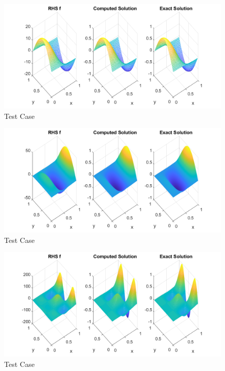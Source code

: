 \begin{enumerate}
\begin{figure}
\centering        
\includegraphics[width=1.0\textwidth]{../code/Case_i.png}
   \caption{Test Case }
   \label{fig:case1}
\end{figure}


\begin{figure}
\centering        
 \includegraphics[width=1.0\textwidth]{../code/Case_ii.png}
   \caption{Test Case }
   \label{fig:case2}
\end{figure}

\begin{figure}
\centering        
\includegraphics[width=1.0\textwidth]{../code/Case_iii.png}
   \caption{Test Case }
   \label{fig:case3}
\end{figure}


\end{enumerate}
